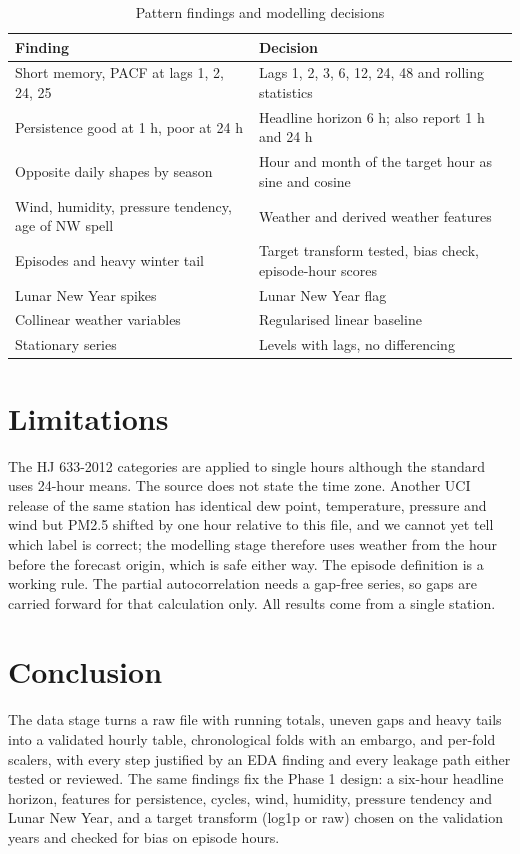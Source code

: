 \documentclass[conference]{IEEEtran}
\begin{document}
\begin{table}[!htb]
\centering
\caption{Pattern findings and modelling decisions}
\label{tab:model}
\begin{tabular}{@{}p{}p{}@{}}
\toprule
Finding & Decision \\
\midrule
Short memory, PACF at lags 1, 2, 24, 25 & Lags 1, 2, 3, 6, 12, 24, 48 and rolling statistics \\
Persistence good at 1 h, poor at 24 h & Headline horizon 6 h; also report 1 h and 24 h \\
Opposite daily shapes by season & Hour and month of the target hour as sine and cosine \\
Wind, humidity, pressure tendency, age of NW spell & Weather and derived weather features \\
Episodes and heavy winter tail & Target transform tested, bias check, episode-hour scores \\
Lunar New Year spikes & Lunar New Year flag \\
Collinear weather variables & Regularised linear baseline \\
Stationary series & Levels with lags, no differencing \\
\bottomrule
\end{tabular}
\end{table}

\section{Limitations}
The HJ 633-2012 categories are applied to single hours although the standard uses 24-hour means. The source does not state the time zone. Another UCI release of the same station \cite{fivecities} has identical dew point, temperature, pressure and wind but PM2.5 shifted by one hour relative to this file, and we cannot yet tell which label is correct; the modelling stage therefore uses weather from the hour before the forecast origin, which is safe either way. The episode definition is a working rule. The partial autocorrelation needs a gap-free series, so gaps are carried forward for that calculation only. All results come from a single station.

\section{Conclusion}
The data stage turns a raw file with running totals, uneven gaps and heavy tails into a validated hourly table, chronological folds with an embargo, and per-fold scalers, with every step justified by an EDA finding and every leakage path either tested or reviewed. The same findings fix the Phase 1 design: a six-hour headline horizon, features for persistence, cycles, wind, humidity, pressure tendency and Lunar New Year, and a target transform (log1p or raw) chosen on the validation years and checked for bias on episode hours.
\end{document}

